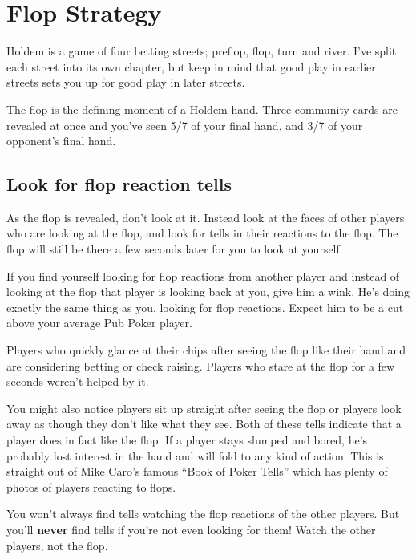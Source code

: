 \chapter{Flop Strategy}


Holdem is a game of four betting streets; preflop, flop, turn and river.
I've split each street into its own chapter, but
keep in mind that good play in earlier streets sets you up for good
play in later streets.

The flop is the defining moment of a Holdem hand. Three community
cards are revealed at once and you've seen 5/7 of your final hand,
and 3/7 of your opponent's final hand.

\section{Look for flop reaction tells}

As the flop is revealed, don't look at it. Instead look
at the faces of other players who are looking
at the flop, and look for tells in their reactions to the flop.
The flop will still be there a few seconds later for you to look at
yourself.

If you find yourself looking for flop reactions from another player
and instead of looking at the flop that player is looking back at you,
give him a wink. He's doing exactly the same thing as you, looking for flop
reactions. Expect him to be a cut above your average Pub Poker player.

Players who quickly glance at their chips after seeing the flop
like their hand and are considering betting or check raising.
Players who stare at the flop for a few seconds weren't helped by it.

You might also notice players sit up straight after seeing the flop
or players look away as though they don't like what they see. Both
of these tells indicate that a player does in fact like the flop.
If a player stays slumped and bored, he's probably lost interest
in the hand and will fold to any kind of action. This is straight
out of Mike Caro's famous ``Book of Poker Tells'' which has plenty
of photos of players reacting to flops.


You won't always find tells watching the flop reactions of the other
players. But you'll \textbf{never} find tells if you're not
even looking for them! Watch the other players, not the flop.


